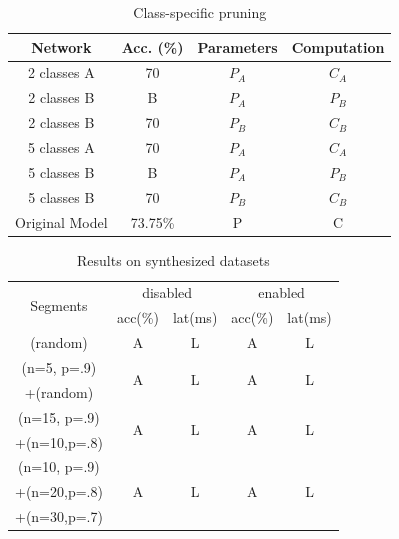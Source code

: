 \documentclass[pageno]{jpaper}
\begin{document}
\begin{table}
    \caption{Class-specific pruning}
    \label{tab:csPruning}

    \centering
    \begin{tabular}{ c|c|cc } 
     \hline
     Network & Acc. (\%) & Parameters & Computation \\ 
     \hline
     2 classes A & 70 & $P_A$ & $C_A$ \\
     2 classes B & B & $P_A$ & $P_B$ \\
     2 classes B & 70 & $P_B$ & $C_B$ \\
     \hline
     5 classes A & 70 & $P_A$ & $C_A$ \\
     5 classes B & B & $P_A$ & $P_B$ \\
     5 classes B & 70 & $P_B$ & $C_B$ \\
     \hline
     Original Model & 73.75\% & P & C \\
     \hline
    \end{tabular}
\end{table}





\begin{table}
    \centering
    \begin{tabular}{c|cc|cc}
    \hline
    \multirow{2}{*}{Segments} & \multicolumn{2}{c|}{disabled} &  \multicolumn{2}{c}{enabled}\\
        & acc(\%) & lat(ms)  & acc(\%) & lat(ms)    \\
    \hline
    (random)      & A & L & A & L \\
    \hline
    (n=5, p=.9)      & \multirow{2}{*}{A} & \multirow{2}{*}{L} & \multirow{2}{*}{A} & \multirow{2}{*}{L} \\
    +(random) & & & & \\
    \hline
    (n=15, p=.9)      & \multirow{2}{*}{A} & \multirow{2}{*}{L} & \multirow{2}{*}{A} & \multirow{2}{*}{L} \\
    +(n=10,p=.8) & & & & \\
    \hline
    (n=10, p=.9)      & \multirow{3}{*}{A} & \multirow{3}{*}{L} & \multirow{3}{*}{A} & \multirow{3}{*}{L} \\
    +(n=20,p=.8) & & & & \\
    +(n=30,p=.7) & & & & \\
    
    \hline
    
    
    \end{tabular}
    \caption{Results on synthesized datasets}
    \label{tab:synthe}
\end{table}
\end{document}
